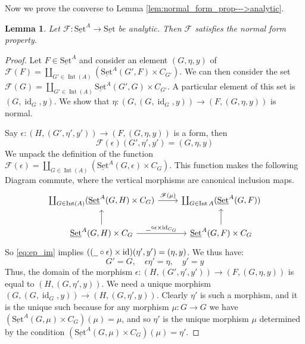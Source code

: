\documentclass[12pt]{article}
\theoremstyle{plain}
\newtheorem{lemma}[thm]{Lemma}
\theoremstyle{definition}
\newcommand{\scr}[1]{\mathscr{#1}}
\newcommand{\und}[1]{\underline{\hspace{#1 cm}}}
\newcommand{\lto}{\longrightarrow}
\newcommand{\set}{\operatorname{\underline{Set}}}
\begin{document}
	Now we prove the converse to Lemma \ref{lem:normal_form_prop--->analytic}.
	\begin{lemma}\label{lem:analytic--->normal_form_property}
		Let $\scr{F}: \set^A \lto \set$ be analytic. Then $\scr{F}$ satisfies the normal form property.
		\end{lemma}
	\begin{proof}
		Let $F \in \set^A$ and consider an element $(G, \eta, y)$ of $\scr{F}(F) = \coprod_{G' \in \operatorname{Int}(A)}(\set^A(G', F) \times C_{G'})$. We can then consider the set $\scr{F}(G) = \coprod_{G' \in \operatorname{Int}(A)}\set^A(G', G) \times C_{G'}$. A particular element of this set is $(G, \operatorname{id}_G, y)$. We show that $\eta: (G, (G, \operatorname{id}_G, y)) \lto (F, (G, \eta, y))$ is normal.
		
		Say $\epsilon: (H, (G', \eta', y')) \lto (F, (G,\eta, y))$ is a form, then
		\begin{equation}\label{eq:ep_im}
			\scr{F}(\epsilon)(G', \eta', y') = (G, \eta, y)
			\end{equation}
		We unpack the definition of the function $\scr{F}(\epsilon) = \coprod_{G \in \operatorname{Int}(A)}(\set^A(G,\epsilon) \times C_G)$. This function makes the following Diagram commute, where the vertical morphisms are canonical inclusion maps.
		\begin{equation}
			\begin{tikzcd}
				\coprod_{G \in \operatorname{Int}(A)}(\set^A(G, H) \times C_G)\arrow[r,"{\scr{F}(\mu)}"] & \coprod_{G \in \operatorname{Int}A}(\set^A(G, F))\\
				\set^A(G, H) \times C_G\arrow[r,"{\und{0.2} \circ \epsilon \times \operatorname{id}_{C_G}}"]\arrow[u] & \set^A(G, F) \times C_G\arrow[u]
				\end{tikzcd}
			\end{equation}
		So \eqref{eq:ep_im} implies $((\und{0.2} \circ \epsilon) \times \operatorname{id})(\eta', y') = (\eta, y)$. We thus have:
		\begin{equation}
				G' = G,\quad \epsilon \eta' = \eta,\quad y' = y
			\end{equation}
		Thus, the domain of the morphism $\epsilon: (H, (G', \eta', y')) \lto (F, (G, \eta, y))$ is equal to $(H, (G, \eta', y))$. We need a unique morphism $(G, (G, \operatorname{id}_G, y)) \lto (H, (G, \eta', y))$. Clearly $\eta'$ is such a morphism, and it is the unique such because for any morphism $\mu: G \lto G$ we have $(\set^A(G, \mu) \times C_G)(\mu) = \mu$,  and so $\eta'$ is the unique morphism $\mu$ determined by the condition $(\set^A(G, \mu) \times C_G)(\mu) = \eta'$.
		\end{proof}
\end{document}
